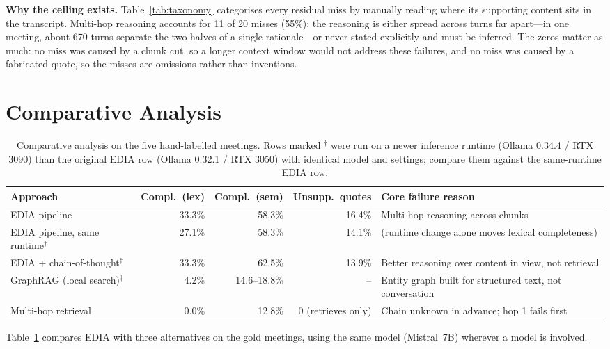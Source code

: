 \documentclass[conference]{IEEEtran}
\begin{document}
\textbf{Why the ceiling exists.} Table~\ref{tab:taxonomy} categorises every
residual miss by manually reading where its supporting content sits in the
transcript. Multi-hop reasoning accounts for 11 of 20 misses (55\%): the
reasoning is either spread across turns far apart---in one meeting, about 670
turns separate the two halves of a single rationale---or never stated
explicitly and must be inferred. The zeros matter as much: no miss was caused
by a chunk cut, so a longer context window would not address these failures,
and no miss was caused by a fabricated quote, so the misses are omissions rather
than inventions.

\section{Comparative Analysis}

\begin{table}[t]
\caption{Comparative analysis on the five hand-labelled meetings. Rows marked
$^\dagger$ were run on a newer inference runtime (Ollama 0.34.4 / RTX 3090) than
the original EDIA row (Ollama 0.32.1 / RTX 3050) with identical model and settings;
compare them against the same-runtime EDIA row.}
\label{tab:compare}
\centering
\small
\begin{tabular}{@{}lrrrl@{}}
\toprule
Approach & Compl.\ (lex) & Compl.\ (sem) & Unsupp.\ quotes & Core failure reason \\
\midrule
EDIA pipeline & 33.3\% & 58.3\% & 16.4\% & Multi-hop reasoning across chunks \\
EDIA pipeline, same runtime$^\dagger$ & 27.1\% & 58.3\% & 14.1\% & (runtime change alone moves lexical completeness) \\
EDIA + chain-of-thought$^\dagger$ & 33.3\% & 62.5\% & 13.9\% & Better reasoning over content in view, not retrieval \\
GraphRAG (local search)$^\dagger$ & 4.2\% & 14.6--18.8\% & -- & Entity graph built for structured text, not conversation \\
Multi-hop retrieval & 0.0\% & 12.8\% & 0 (retrieves only) & Chain unknown in advance; hop 1 fails first \\
\bottomrule
\end{tabular}
\end{table}

Table~\ref{tab:compare} compares EDIA with three alternatives on the gold
meetings, using the same model (Mistral~7B) wherever a model is involved.
\end{document}
